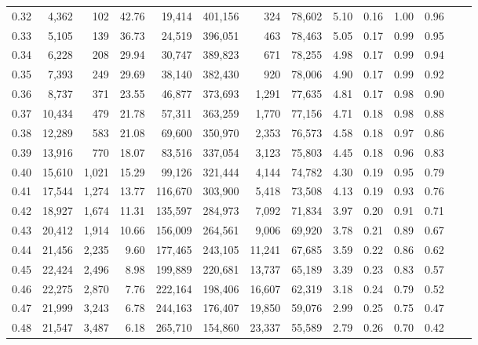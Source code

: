 \begin{tabular}{rrrrrrrrrrrrrr}
0.32 &   4,362 &    102 &   42.76 &   19,414 &  401,156 &     324 &  78,602 &  5.10 &  0.16 &  1.00 &      0.96 \\
0.33 &   5,105 &    139 &   36.73 &   24,519 &  396,051 &     463 &  78,463 &  5.05 &  0.17 &  0.99 &      0.95 \\
0.34 &   6,228 &    208 &   29.94 &   30,747 &  389,823 &     671 &  78,255 &  4.98 &  0.17 &  0.99 &      0.94 \\
0.35 &   7,393 &    249 &   29.69 &   38,140 &  382,430 &     920 &  78,006 &  4.90 &  0.17 &  0.99 &      0.92 \\
0.36 &   8,737 &    371 &   23.55 &   46,877 &  373,693 &   1,291 &  77,635 &  4.81 &  0.17 &  0.98 &      0.90 \\
0.37 &  10,434 &    479 &   21.78 &   57,311 &  363,259 &   1,770 &  77,156 &  4.71 &  0.18 &  0.98 &      0.88 \\
0.38 &  12,289 &    583 &   21.08 &   69,600 &  350,970 &   2,353 &  76,573 &  4.58 &  0.18 &  0.97 &      0.86 \\
0.39 &  13,916 &    770 &   18.07 &   83,516 &  337,054 &   3,123 &  75,803 &  4.45 &  0.18 &  0.96 &      0.83 \\
0.40 &  15,610 &  1,021 &   15.29 &   99,126 &  321,444 &   4,144 &  74,782 &  4.30 &  0.19 &  0.95 &      0.79 \\
0.41 &  17,544 &  1,274 &   13.77 &  116,670 &  303,900 &   5,418 &  73,508 &  4.13 &  0.19 &  0.93 &      0.76 \\
0.42 &  18,927 &  1,674 &   11.31 &  135,597 &  284,973 &   7,092 &  71,834 &  3.97 &  0.20 &  0.91 &      0.71 \\
0.43 &  20,412 &  1,914 &   10.66 &  156,009 &  264,561 &   9,006 &  69,920 &  3.78 &  0.21 &  0.89 &      0.67 \\
0.44 &  21,456 &  2,235 &    9.60 &  177,465 &  243,105 &  11,241 &  67,685 &  3.59 &  0.22 &  0.86 &      0.62 \\
0.45 &  22,424 &  2,496 &    8.98 &  199,889 &  220,681 &  13,737 &  65,189 &  3.39 &  0.23 &  0.83 &      0.57 \\
0.46 &  22,275 &  2,870 &    7.76 &  222,164 &  198,406 &  16,607 &  62,319 &  3.18 &  0.24 &  0.79 &      0.52 \\
0.47 &  21,999 &  3,243 &    6.78 &  244,163 &  176,407 &  19,850 &  59,076 &  2.99 &  0.25 &  0.75 &      0.47 \\
0.48 &  21,547 &  3,487 &    6.18 &  265,710 &  154,860 &  23,337 &  55,589 &  2.79 &  0.26 &  0.70 &      0.42 \\

\end{tabular}
